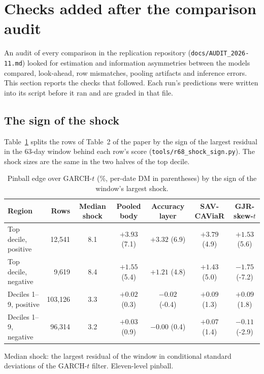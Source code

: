 \section{Checks added after the comparison audit}\label{sec:r67}
An audit of every comparison in the replication repository (\texttt{docs/AUDIT\_2026-11.md}) looked for estimation and information asymmetries between the models compared, look-ahead, row mismatches, pooling artifacts and inference errors. This section reports the checks that followed. Each run's predictions were written into its script before it ran and are graded in that file.

\subsection*{The sign of the shock}
Table~\ref{tab:sign} splits the rows of Table~2 of the paper by the sign of the largest residual in the 63-day window behind each row's score (\texttt{tools/r68\_shock\_sign.py}). The shock sizes are the same in the two halves of the top decile.

\begin{table}[htbp]\centering\begin{threeparttable}
\caption{Pinball edge over GARCH-$t$ (\%, per-date DM in parentheses) by the sign of the window's largest shock.}\label{tab:sign}\footnotesize
\begin{tabular}{lrccccc}\toprule
Region & Rows & Median shock & Pooled body & Accuracy layer & SAV-CAViaR & GJR-skew-$t$ \\ \midrule
Top decile, positive & 12,541 & 8.1 & $+3.93$ (7.1) & $+3.32$ (6.9) & $+3.79$ (4.9) & $+1.53$ (5.6) \\
Top decile, negative & 9,619 & 8.4 & $+1.55$ (5.4) & $+1.21$ (4.8) & $+1.43$ (5.0) & $-1.75$ (-7.2) \\
Deciles 1--9, positive & 103,126 & 3.3 & $+0.02$ (0.3) & $-0.02$ (-0.4) & $+0.09$ (1.3) & $+0.09$ (1.8) \\
Deciles 1--9, negative & 96,314 & 3.2 & $+0.03$ (0.9) & $-0.00$ (0.4) & $+0.07$ (1.4) & $-0.11$ (-2.9) \\
\bottomrule\end{tabular}
\begin{tablenotes}\footnotesize\item Median shock: the largest residual of the window in conditional standard deviations of the GARCH-$t$ filter. Eleven-level pinball.\end{tablenotes}
\end{threeparttable}\end{table}

